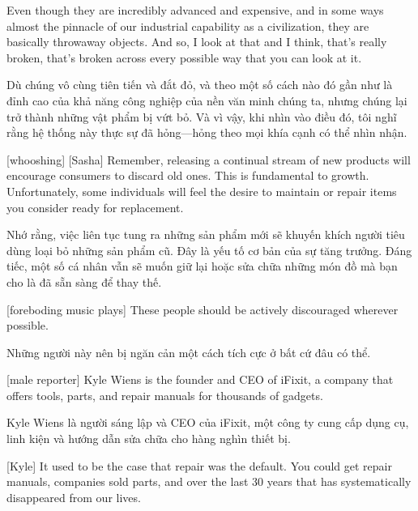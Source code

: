 \documentclass[a4paper]{article}
\begin{document}
	Even though they are incredibly advanced and expensive, and in some ways almost the pinnacle of our industrial capability as a civilization, they are basically throwaway objects.
	And so, I look at that and I think, that's really broken, that's broken across every possible way that you can look at it.
	
	\begin{vietnamese-v2}
		Dù chúng vô cùng tiên tiến và đắt đỏ, và theo một số cách nào đó gần như là đỉnh cao của khả năng công nghiệp của nền văn minh chúng ta, nhưng chúng lại trở thành những vật phẩm bị vứt bỏ. Và vì vậy, khi nhìn vào điều đó, tôi nghĩ rằng hệ thống này thực sự đã hỏng—hỏng theo mọi khía cạnh có thể nhìn nhận.
	\end{vietnamese-v2}
	
	[whooshing]
	[Sasha] Remember, releasing a continual stream of new products will encourage consumers to discard old ones.
	This is fundamental to growth. Unfortunately, some individuals will feel the desire to maintain or repair items you consider ready for replacement.
	
	\begin{vietnamese-v2}
		 Nhớ rằng, việc liên tục tung ra những sản phẩm mới sẽ khuyến khích người tiêu dùng loại bỏ những sản phẩm cũ. Đây là yếu tố cơ bản của sự tăng trưởng. Đáng tiếc, một số cá nhân vẫn sẽ muốn giữ lại hoặc sửa chữa những món đồ mà bạn cho là đã sẵn sàng để thay thế.
	\end{vietnamese-v2}
	
	
	[foreboding music plays]
	These people should be actively discouraged wherever possible.
	
	\begin{vietnamese-v2}
		 Những người này nên bị ngăn cản một cách tích cực ở bất cứ đâu có thể.
	\end{vietnamese-v2}
	
	[male reporter] Kyle Wiens is the founder and CEO of iFixit, a company that offers tools, parts, and repair manuals for thousands of gadgets.
	
	\begin{vietnamese-v2}
		 Kyle Wiens là người sáng lập và CEO của iFixit, một công ty cung cấp dụng cụ, linh kiện và hướng dẫn sửa chữa cho hàng nghìn thiết bị.
	\end{vietnamese-v2}
	
	[Kyle] It used to be the case that repair was the default.
	You could get repair manuals, companies sold parts, and over the last 30 years that has systematically disappeared from our lives.
	
\end{document}
